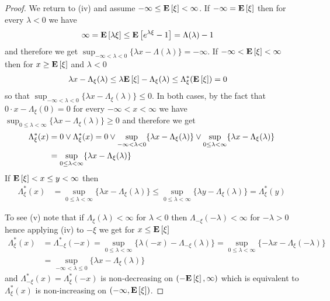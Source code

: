 \begin{proof}
We return to (iv) and assume $-\infty \leq \textbf{E}\left[\xi\right] < \infty$.  If  $-\infty = \textbf{E}\left[\xi\right]$ then for every $\lambda < 0$ we have 
\begin{align*}
\infty &= \textbf{E}\left[\lambda \xi\right] \leq \textbf{E}\left[e^{\lambda \xi} -1\right] = \Lambda(\lambda) -1
\end{align*}
and therefore we get $\sup_{-\infty < \lambda < 0} \lbrace \lambda x - \Lambda(\lambda) \rbrace = -\infty$.  If $-\infty < \textbf{E}\left[\xi\right] < \infty$
then for $x \geq \textbf{E}\left[\xi\right]$ and $\lambda < 0$
\begin{align*}
\lambda x - \Lambda_\xi (\lambda) &\leq \lambda \textbf{E}\left[\xi\right] - \Lambda_\xi(\lambda) \leq \Lambda_\xi^*( \textbf{E}\left[\xi\right] ) = 0
\end{align*}
so that $\sup_{-\infty < \lambda < 0} \lbrace \lambda x - \Lambda_\xi (\lambda)  \rbrace \leq 0$.
In both cases, by the fact  that $0 \cdot x - \Lambda_\xi(0) = 0$ for every $-\infty < x < \infty$ we have $\sup_{0 \leq \lambda < \infty} \lbrace \lambda x - \Lambda_\xi(\lambda) \rbrace \geq 0$ 
and therefore we get
\begin{align*}
\Lambda_\xi^*(x) &= 0 \vee \Lambda_\xi^*(x) = 0 \vee \sup_{-\infty < \lambda < 0} \lbrace \lambda x - \Lambda_\xi(\lambda) \rbrace \vee  \sup_{0 \leq \lambda < \infty} \lbrace \lambda x - \Lambda_\xi(\lambda) \rbrace \\
&= \sup_{0 \leq \lambda < \infty} \lbrace \lambda x - \Lambda_\xi(\lambda) \rbrace
\end{align*}
If $\textbf{E}\left[\xi\right] < x \leq y < \infty$ then 
\begin{align*}
\Lambda_\xi^*(x) &= \sup_{0 \leq \lambda < \infty} \lbrace \lambda x - \Lambda_\xi(\lambda) \rbrace \leq \sup_{0 \leq \lambda < \infty} \lbrace \lambda y  - \Lambda_\xi(\lambda) \rbrace = \Lambda_\xi^*(y)
\end{align*}

To see (v) note that if $\Lambda_\xi(\lambda) < \infty$ for $\lambda < 0$ then $\Lambda_{-\xi}(-\lambda) < \infty$ for $-\lambda > 0$ hence applying (iv) to $-\xi$ we get
for $x \leq \textbf{E}\left[\xi\right]$ 
\begin{align*}
\Lambda_\xi^*(x) &= \Lambda_{-\xi}^*(-x) = \sup_{0 \leq \lambda < \infty} \lbrace \lambda (-x) - \Lambda_{-\xi}(\lambda) \rbrace 
= \sup_{0 \leq \lambda < \infty} \lbrace -\lambda x - \Lambda_{\xi}(-\lambda) \rbrace \\
&= \sup_{-\infty < \lambda \leq 0 } \lbrace \lambda x- \Lambda_{\xi}(\lambda) \rbrace
\end{align*}
and $\Lambda_{-\xi}^*(x)=\Lambda_{\xi}^*(-x)$ is non-decreasing on $(-\textbf{E}\left[\xi\right], \infty)$ which is equivalent to $\Lambda_{\xi}^*(x)$ is non-increasing on $(-\infty, \textbf{E}\left[\xi\right])$.


\end{proof}
